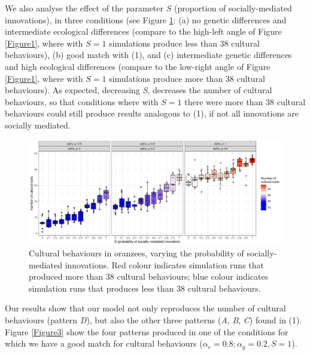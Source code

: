 \documentclass[9pt,twocolumn,twoside,]{pnas-new}
\begin{document}
We also analyse the effect of the parameter \(S\) (proportion of
socially-mediated innovations), in three conditions (see Figure
\ref{Figure2}: (a) no genetic differences and intermediate ecological
differences (compare to the high-left angle of Figure \ref{Figure1},
where with \(S=1\) simulations produce less than 38 cultural
behaviours), (b) good match with (1), and (c) intermediate genetic
differences and high ecological differences (compare to the low-right
angle of Figure \ref{Figure1}, where with \(S=1\) simulations produce
more than 38 cultural behaviours). As expected, decreasing \emph{S},
decreases the number of cultural behaviours, so that conditions where
with \(S=1\) there were more than 38 cultural behaviours could still
produce results analogous to (1), if not all innovations are socially
mediated.

\begin{figure}[h!]
\begin{center}
\includegraphics[width=17.8cm]{figures/figure_2.pdf}
\caption{Cultural behaviours in oranzees, varying the probability of socially-mediated innovations. Red colour indicates simulation runs that produced more than 38 cultural behaviours; blue colour indicates simulation runs that produces less than 38 cultural behaviours.}
\label{Figure2}
\end{center}
\end{figure}

Our results show that our model not only reproduces the number of
cultural behaviours (pattern \emph{D}), but also the other three
patterns (\emph{A}, \emph{B}, \emph{C}) found in (1). Figure
\ref{Figure3} show the four patterns produced in one of the conditions
for which we have a good match for cultural behaviours
(\(\alpha_e=0.8;\alpha_g=0.2, S=1\)).
\end{document}
